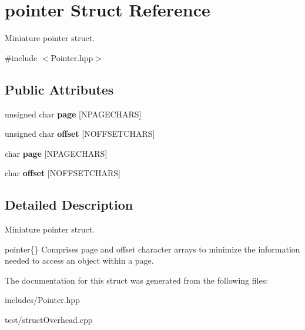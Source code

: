 \hypertarget{structpointer}{}\section{pointer Struct Reference}
\label{structpointer}


Miniature pointer struct.  




{\ttfamily \#include $<$Pointer.\+hpp$>$}

\subsection*{Public Attributes}
\begin{DoxyCompactItemize}
\item 
\mbox{\label{structpointer_ab87c49e9530aac6ca6e774e4f9e4ee79}} 
unsigned char {\bfseries page} \mbox{[}N\+P\+A\+G\+E\+C\+H\+A\+RS\mbox{]}
\item 
\mbox{\label{structpointer_a10d309201f42a88b3ea6ae824cf29c06}} 
unsigned char {\bfseries offset} \mbox{[}N\+O\+F\+F\+S\+E\+T\+C\+H\+A\+RS\mbox{]}
\item 
\mbox{\label{structpointer_a6b99504e0c08397e28c749f87ae69984}} 
char {\bfseries page} \mbox{[}N\+P\+A\+G\+E\+C\+H\+A\+RS\mbox{]}
\item 
\mbox{\label{structpointer_acb55bc4d12e4f0ae766eeda780abc7d6}} 
char {\bfseries offset} \mbox{[}N\+O\+F\+F\+S\+E\+T\+C\+H\+A\+RS\mbox{]}
\end{DoxyCompactItemize}


\subsection{Detailed Description}
Miniature pointer struct. 

pointer\{\} Comprises page and offset character arrays to minimize the information needed to access an object within a page. 

The documentation for this struct was generated from the following files\+:\begin{DoxyCompactItemize}
\item 
includes/Pointer.\+hpp\item 
test/struct\+Overhead.\+cpp\end{DoxyCompactItemize}
